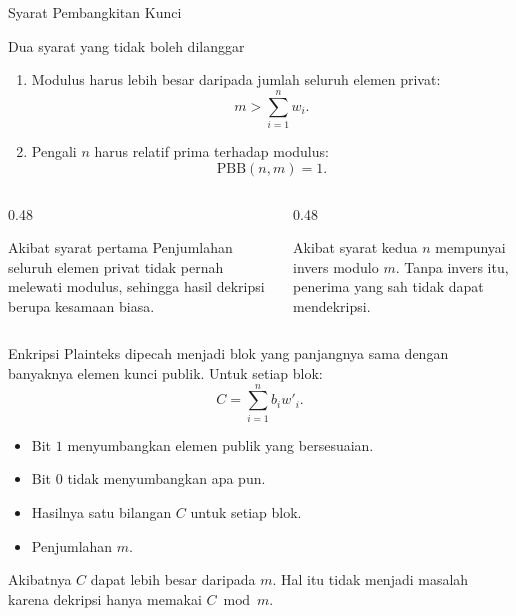 \documentclass[aspectratio=169,11pt]{beamer}
\begin{document}
\begin{frame}{Syarat Pembangkitan Kunci}
    \begin{block}{Dua syarat yang tidak boleh dilanggar}
        \begin{enumerate}
            \item Modulus harus lebih besar daripada jumlah seluruh elemen
                  privat:
                  \[
                      m > \sum_{i=1}^{n} w_i.
                  \]
            \item Pengali $n$ harus relatif prima terhadap modulus:
                  \[
                      \mathrm{PBB}(n,m) = 1.
                  \]
        \end{enumerate}
    \end{block}
    \vspace{0.15cm}
    \begin{columns}[T,onlytextwidth]
        \begin{column}{0.48\textwidth}
            \begin{exampleblock}{Akibat syarat pertama}
                \footnotesize
                Penjumlahan seluruh elemen privat tidak pernah melewati
                modulus, sehingga hasil dekripsi berupa kesamaan biasa.
            \end{exampleblock}
        \end{column}
        \begin{column}{0.48\textwidth}
            \begin{alertblock}{Akibat syarat kedua}
                \footnotesize
                $n$ mempunyai invers modulo $m$. Tanpa invers itu, penerima
                yang sah tidak dapat mendekripsi.
            \end{alertblock}
        \end{column}
    \end{columns}
\end{frame}

\begin{frame}{Enkripsi}
    Plainteks dipecah menjadi blok yang panjangnya sama dengan banyaknya
    elemen kunci publik. Untuk setiap blok:
    \[
        C = \sum_{i=1}^{n} b_i w'_i.
    \]
    \begin{itemize}
        \item Bit $1$ menyumbangkan elemen publik yang bersesuaian.
        \item Bit $0$ tidak menyumbangkan apa pun.
        \item Hasilnya satu bilangan $C$ untuk setiap blok.
        \item Penjumlahan  $m$.
    \end{itemize}
    \vspace{0.1cm}
    \begin{exampleblock}{Akibatnya}
        \footnotesize
        $C$ dapat lebih besar daripada $m$. Hal itu tidak menjadi masalah
        karena dekripsi hanya memakai $C \bmod m$.
    \end{exampleblock}
\end{frame}
\end{document}
